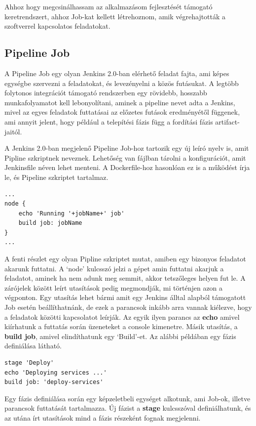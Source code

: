 \documentclass[11pt,magyar,a4paper,twoside,]{report}
\begin{document}
Ahhoz hogy megcsinálhassam az alkalmazásom fejlesztését támogató
keretrendszert, ahhoz Job-kat kellett létrehoznom, amik végrehajtották a
szoftverrel kapcsolatos feladatokat.

\subsection{Pipeline Job}\label{pipeline-job}

A Pipeline Job egy olyan Jenkins 2.0-ban elérhető feladat fajta, ami
képes egységbe szervezni a feladatokat, és levezényelni a közös
futásukat. A legtöbb folytonos integrációt támogató rendszerben egy
rövidebb, hosszabb munkafolyamatot kell lebonyolítani, aminek a pipeline
nevet adta a Jenkins, mivel az egyes feladatok futtatásai az előzetes
futások eredményétől függenek, ami annyit jelent, hogy például a
telepítési fázis függ a fordítási fázis artifact-jaitól.

A Jenkins 2.0-ban megjelenő Pipeline Job-hoz tartozik egy új leíró nyelv
is, amit Pipline szkriptnek neveznek. Lehetőség van fájlban tárolni a
konfigurációt, amit Jenkinsfile néven lehet menteni. A Dockerfile-hoz
hasonlóan ez is a működést írja le, és Pipeline szkriptet tartalmaz.

\begin{verbatim}
...
node {
    echo 'Running '+jobName+' job'
    build job: jobName
}
...
\end{verbatim}

A fenti részlet egy olyan Pipline szkriptet mutat, amiben egy bizonyos
feladatot akarunk futtatni. A `node' kulcsszó jelzi a gépet amin
futtatni akarjuk a feladatot, aminek ha nem adunk meg semmit, akkor
tetszőleges helyen fut le. A zárójelek között leírt utasítások pedig
megmondják, mi történjen azon a végponton. Egy utasítás lehet bármi amit
egy Jenkins álltal alapból támogatott Job esetén beállíthatnánk, de ezek
a parancsok inkább arra vannak kiélezve, hogy a feladatok közötti
kapcsolatot leírják. Az egyik ilyen parancs az \textbf{echo} amivel
kiírhatunk a futtatás során üzeneteket a console kimenetre. Másik
utasítás, a \textbf{build job}, amivel elindíthatunk egy `Build'-et. Az
alábbi példában egy fázis definiálása látható.

\begin{verbatim}
stage 'Deploy'
echo 'Deploying services ...'
build job: 'deploy-services'
\end{verbatim}

Egy fázis definiálása során egy képzeletbeli egységet alkotunk, ami
Job-ok, illetve parancsok futtatását tartalmazza. Új fázist a
\textbf{stage} kulcsszóval definiálhatunk, és az utána írt utasítások
mind a fázis részeként fognak megjelenni.
\end{document}
